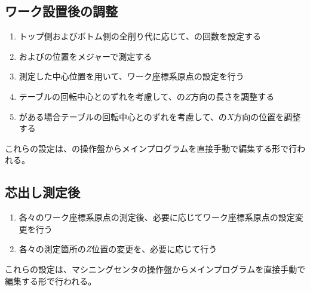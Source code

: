 \subsection{ワーク設置後の調整}
\begin{enumerate}[label=\sarrow]
\item トップ側およびボトム側の全削り代に応じて、\nameEndFacecutMilling の回数を設定する
\item \TopODCenter および\BottomODCenter の位置をメジャーで測定する
\item 測定した中心位置を用いて、ワーク座標系原点の設定を行う
\item {}テーブルの回転中心とのずれを考慮して、\EndFace の$Z$方向の長さを調整する
\item \CenterlineEndFaceDif がある場合テーブルの回転中心とのずれを考慮して、\OutcutCenter の$X$方向の位置を調整する
\end{enumerate}
これらの設定は、\MMC の操作盤からメインプログラムを直接手動で編集する形で行われる。



\clearpage


\subsection{芯出し測定後}
\begin{enumerate}[label=\sarrow]
\item 各々のワーク座標系原点の測定後、必要に応じてワーク座標系原点の設定変更を行う
\item 各々の測定箇所の$Z$位置の変更を、必要に応じて行う
\end{enumerate}
これらの設定は、マシニングセンタの操作盤からメインプログラムを直接手動で編集する形で行われる。


